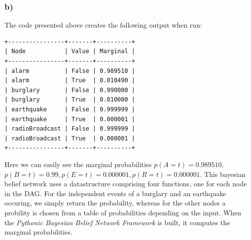 \documentclass[11pt,a4paper]{article}
\begin{document}
\subsubsection*{b)}
The code presented above creates the following output when run:
\begin{verbatim}
+----------------+-------+----------+
| Node           | Value | Marginal |
+----------------+-------+----------+
| alarm          | False | 0.989510 |
| alarm          | True  | 0.010490 |
| burglary       | False | 0.990000 |
| burglary       | True  | 0.010000 |
| earthquake     | False | 0.999999 |
| earthquake     | True  | 0.000001 |
| radioBroadcast | False | 0.999999 |
| radioBroadcast | True  | 0.000001 |
+----------------+-------+----------+
\end{verbatim}
Here we can easily see the marginal probabilities $p(A = t) = 0.989510,$ \\$p(B = t) = 0.99, p(E = t) = 0.000001, p(R = t) = 0.000001$.
This bayesian belief network uses a datastructure comprising four functions, one for each node in the DAG. For the independent events of a burglary and an earthquake occuring, we simply return the probability, whereas for the other nodes a probility is chosen from a table of probabilities depending on the input. When the \textit{Pythonic Bayesian Belief Network Framework} is built, it computes the marginal probabilities.
\end{document}
